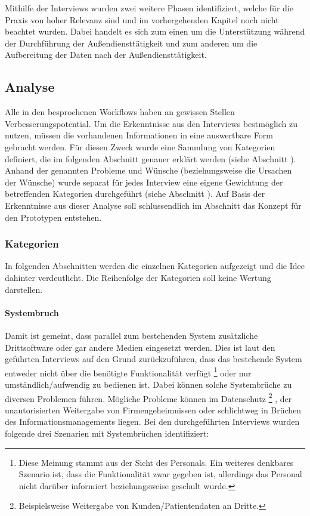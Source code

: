 \documentclass[Bachelorarbeit.tex]{subfiles}
\begin{document}
Mithilfe der Interviews wurden zwei weitere Phasen identifiziert, welche für die Praxis von hoher Relevanz sind und im vorhergehenden Kapitel noch nicht beachtet wurden.
Dabei handelt es sich zum einen um die Unterstützung während der Durchführung der Außendiensttätigkeit und zum anderen um die Aufbereitung der Daten nach der Außendiensttätigkeit.

\subsection{Analyse}
\label{AnalyseInterviews}
Alle in den  besprochenen Workflows haben an gewissen Stellen Verbesserungspotential. 
Um die Erkenntnisse aus den Interviews bestmöglich zu nutzen, müssen die vorhandenen Informationen in eine auswertbare Form gebracht werden.
Für diesen Zweck wurde eine Sammlung von Kategorien definiert, die im folgenden Abschnitt genauer erklärt werden (siehe Abschnitt ).
Anhand der genannten Probleme und Wünsche (beziehungsweise die Ursachen der Wünsche) wurde separat für jedes Interview eine eigene Gewichtung der betreffenden Kategorien durchgeführt (siehe Abschnitt ). 
Auf Basis der Erkenntnisse aus dieser Analyse soll schlussendlich im Abschnitt  das Konzept für den Prototypen entstehen.


\subsubsection{Kategorien}
\label{analyse:kategorien}
In folgenden Abschnitten werden die einzelnen Kategorien aufgezeigt und die Idee dahinter verdeutlicht.
Die Reihenfolge der Kategorien soll keine Wertung darstellen.

\paragraph{Systembruch}
\label{interviewsAnalyseSystembruch}
Damit ist gemeint, dass parallel zum bestehenden System zusätzliche Drittsoftware oder gar andere Medien eingesetzt werden.
Dies ist laut den geführten Interviews auf den Grund zurückzuführen, dass das bestehende System entweder nicht über die benötigte Funktionalität verfügt
\footnote{
	Diese Meinung stammt aus der Sicht des Personals. 
	Ein weiteres denkbares Szenario ist, dass die Funktionalität zwar gegeben ist, allerdings das Personal nicht darüber informiert beziehungsweise geschult wurde.
	} 
oder nur umständlich/aufwendig zu bedienen ist.
Dabei können solche Systembrüche zu diversen Problemen führen. 
Mögliche Probleme können im Datenschutz
\footnote{
	Beispielsweise Weitergabe von Kunden/Patientendaten an Dritte.
	}
	, der unautorisierten Weitergabe von Firmengeheimnissen oder schlichtweg in Brüchen des Informationsmanagements liegen.  
Bei den durchgeführten Interviews wurden folgende drei Szenarien mit Systembrüchen identifiziert:
\end{document}
